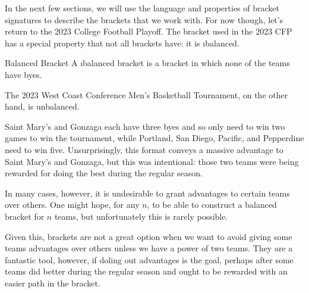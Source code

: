 {In the next few sections, we will use the language and properties of bracket signatures to describe the brackets that we work with. For now though, let's return to the 2023 College Football Playoff. The bracket used in the 2023 CFP has a special property that not all brackets have: it is \i{balanced}.

\begin{definition}{Balanced Bracket}{}
    A \i{balanced bracket} is a bracket in which none of the teams have byes.
\end{definition} 

The 2023 West Coast Conference Men's Basketball Tournament, on the other hand, is unbalanced.

Saint Mary's and Gonzaga each have three byes and so only need to win two games to win the tournament, while Portland, San Diego, Pacific, and Pepperdine need to win five. Unsurprisingly, this format conveys a massive advantage to Saint Mary's and Gonzaga, but this was intentional: those two teams were being rewarded for doing the best during the regular season.

In many cases, however, it is undesirable to grant advantages to certain teams over others. One might hope, for any $n$, to be able to construct a balanced bracket for $n$ teams, but unfortunately this is rarely possible.


Given this, brackets are not a great option when we want to avoid giving some teams advantages over others unless we have a power of two teams. They are a fantastic tool, however, if doling out advantages is the goal, perhaps after some teams did better during the regular season and ought to be rewarded with an easier path in the bracket.
}